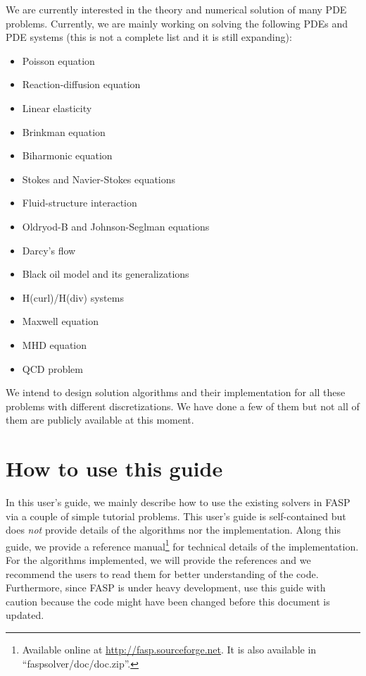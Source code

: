 \documentclass[11pt]{memoir}
\begin{document}
We are currently interested in the theory and numerical solution of many PDE problems. Currently, we are mainly working on solving the following PDEs and PDE systems (this is not a complete list and it is still expanding):
\begin{itemize}
\item Poisson equation
\item Reaction-diffusion equation
\item Linear elasticity
\item Brinkman equation
\item Biharmonic equation
\item Stokes and Navier-Stokes equations
\item Fluid-structure interaction
\item Oldryod-B and Johnson-Seglman equations
\item Darcy's flow
\item Black oil model and its generalizations
\item H(curl)/H(div) systems
\item Maxwell equation
\item MHD equation
\item QCD problem
\end{itemize}
%
We intend to design solution algorithms and their implementation for all these problems with different discretizations. We have done a few of them but not all of them are publicly available at this moment.


\section{How to use this guide}\label{sec:how}

In this user's guide, we mainly describe how to use the existing solvers in FASP via a couple of simple tutorial problems. This user's guide is self-contained but does \emph{not} provide details of the algorithms nor the implementation. Along this guide, we provide a reference manual\footnote{Available online at \url{http://fasp.sourceforge.net}. It is also available in ``faspsolver/doc/doc.zip''.} for technical details of the implementation. For the algorithms implemented, we will provide the references and we recommend the users to read them for better understanding of the code. Furthermore, since FASP is under heavy development, use this guide with caution because the code might have been changed before this document is updated.
\end{document}
